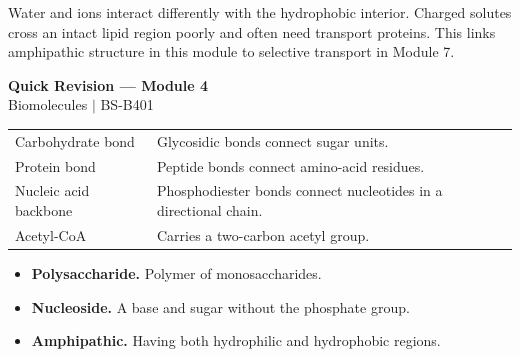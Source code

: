 \documentclass[12pt,a4paper]{article}
\renewcommand{\arraystretch}{1.45}
\begin{document}
\begin{tcolorbox}[masonbox, title={Explain why bilayers are selective}]
Water and ions interact differently with the hydrophobic interior. Charged solutes cross an intact lipid region poorly and often need transport proteins. This links amphipathic structure in this module to selective transport in Module 7.
\end{tcolorbox}

\newpage
\begin{center}
  {\large\bfseries\color{myred} Quick Revision --- Module 4}\\[3pt]
  {\small\color{mydark} Biomolecules $|$ BS-B401}
\end{center}
\noindent{\color{myred}\rule{\linewidth}{1.2pt}}\par\vspace{4pt}

\begin{tcolorbox}[formulabox, title={Key Concepts at a Glance}]
\renewcommand{\arraystretch}{1.35}
\noindent\begin{tabularx}{\linewidth}{B{4.5cm}Y}
Carbohydrate bond & Glycosidic bonds connect sugar units. \\[3pt]
Protein bond & Peptide bonds connect amino-acid residues. \\[3pt]
Nucleic acid backbone & Phosphodiester bonds connect nucleotides in a directional chain. \\[3pt]
Acetyl-CoA & Carries a two-carbon acetyl group. \\[3pt]
\end{tabularx}\par
\end{tcolorbox}

\begin{tcolorbox}[defbox, title={One-Line Definitions}]
\begin{itemize}[leftmargin=*, itemsep=3pt, topsep=4pt]
  \item \textbf{Polysaccharide.} Polymer of monosaccharides.
  \item \textbf{Nucleoside.} A base and sugar without the phosphate group.
  \item \textbf{Amphipathic.} Having both hydrophilic and hydrophobic regions.
\end{itemize}
\end{tcolorbox}
\end{document}
